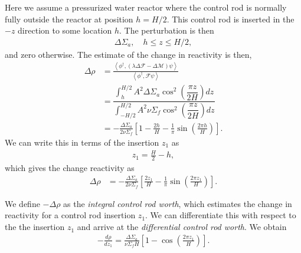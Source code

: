 Here we assume a pressurized water reactor where the control rod is normally fully outside the reactor at position $h = H/2$. This control rod is inserted in the $-z$ direction to some location $h$. The perturbation is then
\begin{align}
  \Delta \Sigma_a , \quad h \le z \le H/2, \nonumber
\end{align}
and zero otherwise. The estimate of the change in reactivity is then,
\begin{align}
  \Delta \rho 
  &= \frac{ \left< \phi^\dagger, (  \lambda \Delta \mathcal{F} - \Delta \mathcal{M} ) \psi \right> }{ \left< \phi^\dagger, \mathcal{F} \psi \right> } \nonumber \\
  &= \dfrac{ \displaystyle\int_h^{H/2} A^2 \Delta \Sigma_a \cos^2 \left( \dfrac{\pi z}{2 H} \right)dz }{ \displaystyle\int_{-H/2}^{H/2} A^2 \nu\Sigma_f \cos^2 \left( \dfrac{\pi z}{2 H} \right)dz }  \nonumber \\
  &= -\frac{ \Delta \Sigma_a }{ 2 \nu\Sigma_f } \left[ 1 - \frac{2h}{H} - \frac{1}{\pi} \sin\left( \frac{2\pi h}{H} \right) \right] .
\end{align}
We can write this in terms of the insertion $z_1$ as
\begin{align}
  z_1 = \frac{H}{2} - h ,
\end{align}
which gives the change reactivity as
\begin{align}
  \Delta \rho 
  &= -\frac{ \Delta \Sigma_a }{ 2 \nu\Sigma_f } \left[ \frac{2 z_1}{H}  - \frac{1}{\pi} \sin\left( \frac{2\pi z_1}{H} \right) \right] .
\end{align}

We define $-\Delta \rho$ as the \emph{integral control rod worth}, which estimates the change in reactivity for a control rod insertion $z_1$. We can differentiate this with respect to the the insertion $z_1$ and arrive at the \emph{differential control rod worth}. We obtain
\begin{align}
 -\frac{d\rho}{dz_1} = \frac{\Delta \Sigma_a}{ \nu \Sigma_f H } \left[ 1 - \cos\left( \frac{2\pi z_1}{H} \right) \right] .
\end{align}


